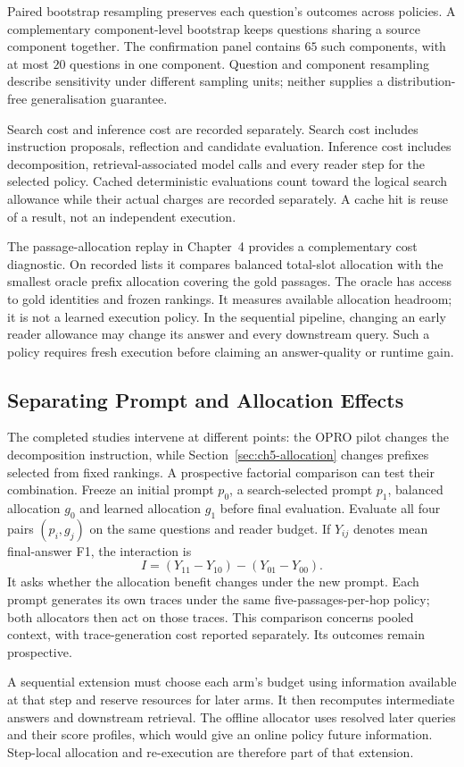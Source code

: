 Paired bootstrap resampling preserves each question's outcomes across
policies. A complementary component-level bootstrap keeps questions sharing
a source component together. The confirmation panel contains $65$ such
components, with at most $20$ questions in one component. Question and
component resampling describe sensitivity under different sampling units;
neither supplies a distribution-free generalisation guarantee.

Search cost and inference cost are recorded separately. Search cost includes
instruction proposals, reflection and candidate evaluation. Inference cost
includes decomposition, retrieval-associated model calls and every reader
step for the selected policy. Cached deterministic evaluations count toward
the logical search allowance while their actual charges are recorded
separately. A cache hit is reuse of a result, not an independent execution.

The passage-allocation replay in Chapter~4 provides a complementary cost
diagnostic. On recorded lists it compares balanced total-slot allocation with
the smallest oracle prefix allocation covering the gold passages. The oracle
has access to gold identities and frozen rankings. It measures available
allocation headroom; it is not a learned execution policy. In the sequential
pipeline, changing an early reader allowance may change its answer and every
downstream query. Such a policy requires fresh execution before claiming an
answer-quality or runtime gain.

\subsection{Separating Prompt and Allocation Effects}

The completed studies intervene at different points: the OPRO pilot changes
the decomposition instruction, while Section~\ref{sec:ch5-allocation}
changes prefixes selected from fixed rankings. A prospective factorial
comparison can test their combination. Freeze an initial prompt $p_0$, a
search-selected prompt $p_1$, balanced allocation $g_0$ and learned
allocation $g_1$ before final evaluation. Evaluate all four pairs
$(p_i,g_j)$ on the same questions and reader budget. If $Y_{ij}$ denotes
mean final-answer F1, the interaction is
\begin{equation}
  I=(Y_{11}-Y_{10})-(Y_{01}-Y_{00}).
  \label{eq:ch5-factorial}
\end{equation}
It asks whether the allocation benefit changes under the new prompt.
Each prompt generates its own traces under the same five-passages-per-hop
policy; both allocators then act on those traces. This comparison concerns
pooled context, with trace-generation cost reported separately. Its
outcomes remain prospective.

A sequential extension must choose each arm's budget using information
available at that step and reserve resources for later arms. It then
recomputes intermediate answers and downstream retrieval. The offline
allocator uses resolved later queries and their score profiles, which
would give an online policy future information. Step-local allocation
and re-execution are therefore part of that extension.
